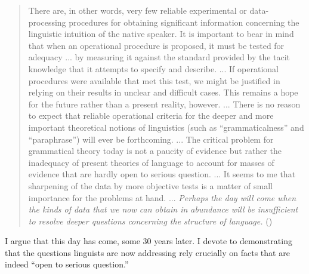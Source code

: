 \begin{quote}
There are, in other words, very few reliable experimental or data-processing procedures for obtaining significant information concerning the linguistic intuition of the native speaker. It is important to bear in mind that when an operational procedure is proposed, it must be tested for adequacy ... by measuring it against the standard provided by the tacit knowledge that it attempts to specify and describe. ... If operational procedures were available that met this test, we might be justified in relying on their results in unclear and difficult cases. This remains a hope for the future rather than a present reality, however. ... There is no reason to expect that reliable operational criteria for the deeper and more important theoretical notions of linguistics (such as ``grammaticalness'' and ``paraphrase'') will ever be forthcoming. ... The critical problem for grammatical theory today is not a paucity of evidence but rather the inadequacy of present theories of language to account for masses of evidence that are hardly open to serious question. ... It seems to me that sharpening of the data by more objective tests is a matter of small importance for the problems at hand. ... \textit{Perhaps the day will come when the kinds of data that we now can obtain in abundance will be insufficient to resolve deeper questions concerning the structure of language.} ()
\end{quote}

\noindent
I argue that this day has come, some 30 years later. I devote  to demonstrating that the questions linguists are now addressing rely crucially on facts that are indeed ``open to serious question.''


